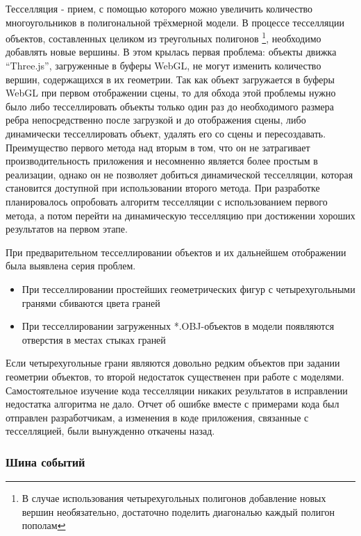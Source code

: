 \documentclass[12pt, a4paper]{article}
\begin{document}
Тесселляция - прием, с помощью которого можно увеличить количество
многоугольников в полигональной трёхмерной модели. В процессе тесселляции
объектов, составленных целиком из треугольных полигонов \footnote{В случае
использования четырехугольных полигонов добавление новых вершин необязательно,
достаточно поделить диагональю каждый полигон пополам}, необходимо добавлять
новые вершины. В этом крылась первая проблема: объекты движка ``Three.js'',
загруженные в буферы WebGL, не могут изменить количество вершин, содержащихся в
их геометрии. Так как объект загружается в буферы WebGL при первом отображении
сцены, то для обхода этой проблемы нужно было либо тесселлировать объекты только
один раз до необходимого размера ребра непосредственно после загрузкой и до
отображения сцены, либо динамически тесселлировать объект, удалять его со сцены
и пересоздавать. Преимущество первого метода над вторым в том, что он не
затрагивает производительность приложения и несомненно является более простым в
реализации, однако он не позволяет добиться динамической тесселляции, которая
становится доступной при использовании второго метода. При разработке
планировалось опробовать алгоритм тесселляции с использованием первого метода, а
потом перейти на динамическую тесселляцию при достижении хороших результатов на
первом этапе.

При предварительном тесселлировании объектов и их дальнейшем отображении была
выявлена серия проблем.

\begin{itemize}
    \item При тесселлировании простейших геометрических фигур с четырехугольными
    гранями сбиваются цвета граней
    \item При тесселлировании загруженных *.OBJ-объектов в модели появляются
    отверстия в местах стыках граней
\end{itemize}

Если четырехугольные грани являются довольно редким объектов при задании
геометрии объектов, то второй недостаток существенен при работе с моделями.
Самостоятельное изучение кода тесселляции никаких результатов в
исправлении недостатка алгоритма не дало. Отчет об ошибке вместе с примерами
кода был отправлен разработчикам, а изменения в коде приложения,
связанные с тесселляцией, были вынужденно откачены назад.

\subsubsection{Шина событий}
\end{document}
